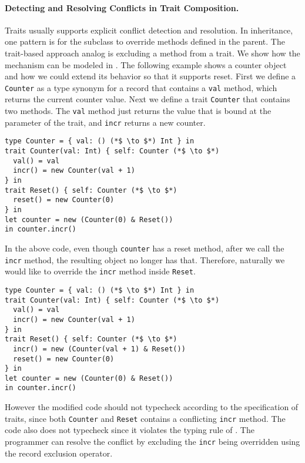 \paragraph{Detecting and Resolving Conflicts in Trait Composition.}
Traits usually supports explicit conflict detection and resolution.
In inheritance, one pattern is for the subclass to override methods defined in the parent.
The trait-based approach analog is excluding a method from a trait.
We show how the mechanism can be modeled in \name.
The following example shows a counter object and how we could extend its
behavior so that it supports reset. First we define a \lstinline$Counter$ as a
type synonym for a record that contains a \lstinline$val$ method, which returns
the current counter value. Next we define a trait \lstinline$Counter$ that
contains two methods. The \lstinline$val$ method just returns the value that is
bound at the parameter of the trait, and \lstinline$incr$ returns a new counter.
\begin{lstlisting}
type Counter = { val: () (*$ \to $*) Int } in
trait Counter(val: Int) { self: Counter (*$ \to $*)
  val() = val
  incr() = new Counter(val + 1)
} in
trait Reset() { self: Counter (*$ \to $*)
  reset() = new Counter(0)
} in
let counter = new (Counter(0) & Reset())
in counter.incr()
\end{lstlisting}

In the above code, even though \lstinline$counter$ has a reset method, after we
call the \lstinline$incr$ method, the resulting object no longer has that.
Therefore, naturally we would like to override the \lstinline$incr$ method
inside \lstinline$Reset$.

\begin{lstlisting}
type Counter = { val: () (*$ \to $*) Int } in
trait Counter(val: Int) { self: Counter (*$ \to $*)
  val() = val
  incr() = new Counter(val + 1)
} in
trait Reset() { self: Counter (*$ \to $*)
  incr() = new (Counter(val + 1) & Reset())
  reset() = new Counter(0)
} in
let counter = new (Counter(0) & Reset())
in counter.incr()
\end{lstlisting}

However the modified code should not typecheck according to the specification of
traits, since both \lstinline$Counter$ and \lstinline$Reset$ contains a
conflicting \lstinline$incr$ method. The code also does not typecheck since it
violates the typing rule of \name. The programmer can resolve the conflict by
excluding the \lstinline$incr$ being overridden using the record exclusion
operator.


